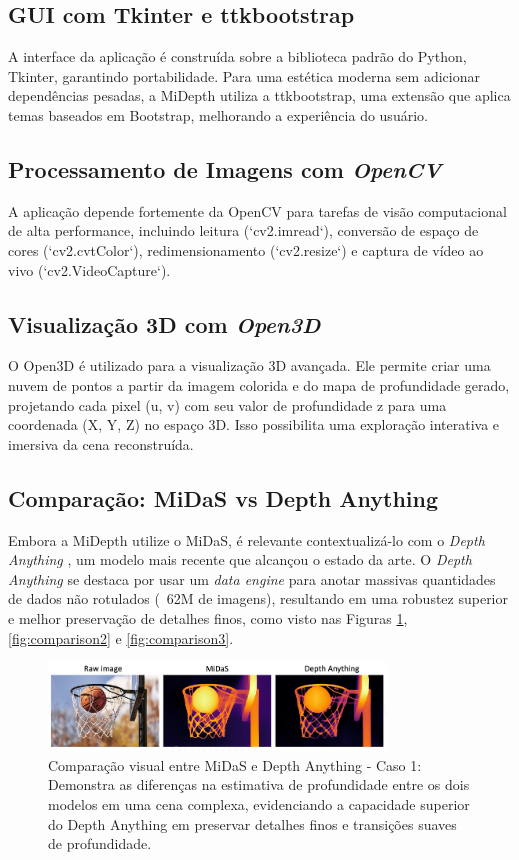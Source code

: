 \documentclass{SBCbookchapter}
\newcommand{\nomeProjeto}{MiDepth }
\begin{document}
    \subsection{GUI com Tkinter e ttkbootstrap}
    A interface da aplicação é construída sobre a biblioteca padrão do Python, Tkinter, garantindo portabilidade. Para uma estética moderna sem adicionar dependências pesadas, a \nomeProjeto utiliza a ttkbootstrap, uma extensão que aplica temas baseados em Bootstrap, melhorando a experiência do usuário.

    \subsection{Processamento de Imagens com \textit{OpenCV}}
    A aplicação depende fortemente da OpenCV para tarefas de visão computacional de alta performance, incluindo leitura (`cv2.imread`), conversão de espaço de cores (`cv2.cvtColor`), redimensionamento (`cv2.resize`) e captura de vídeo ao vivo (`cv2.VideoCapture`).

    \subsection{Visualização 3D com \textit{Open3D}}
    O Open3D é utilizado para a visualização 3D avançada. Ele permite criar uma nuvem de pontos a partir da imagem colorida e do mapa de profundidade gerado, projetando cada pixel (u, v) com seu valor de profundidade z para uma coordenada (X, Y, Z) no espaço 3D. Isso possibilita uma exploração interativa e imersiva da cena reconstruída.
    
    \subsection{Comparação: MiDaS vs Depth Anything}
    Embora a \nomeProjeto utilize o MiDaS, é relevante contextualizá-lo com o \textit{Depth Anything} \cite{yang2024}, um modelo mais recente que alcançou o estado da arte. O \textit{Depth Anything} se destaca por usar um \textit{data engine} para anotar massivas quantidades de dados não rotulados (~62M de imagens), resultando em uma robustez superior e melhor preservação de detalhes finos, como visto nas Figuras \ref{fig:comparison1}, \ref{fig:comparison2} e \ref{fig:comparison3}.

    \begin{figure}[h!]
        \centering
        \includegraphics[width=0.8\textwidth]{
            .resources/MiDaS x Depth Anything 01.png
        }
        \caption{Comparação visual entre MiDaS e Depth Anything - Caso 1: Demonstra
        as diferenças na estimativa de profundidade entre os dois modelos em uma
        cena complexa, evidenciando a capacidade superior do Depth Anything em
        preservar detalhes finos e transições suaves de profundidade.}
        \label{fig:comparison1}
    \end{figure}
    
\end{document}
